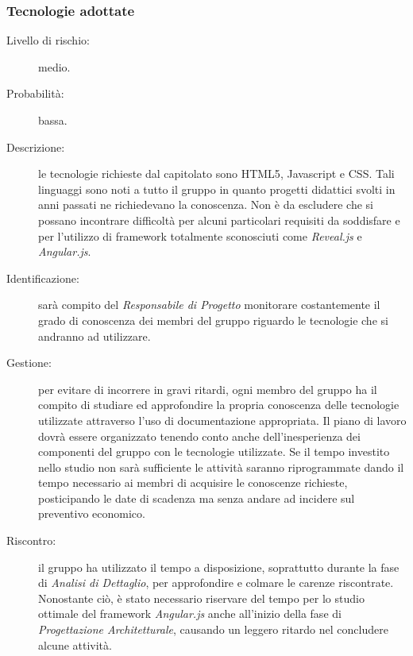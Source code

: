 \subsubsection{Tecnologie adottate}
\begin{description}
	\item[Livello di rischio:] medio.
	\item[Probabilità:] bassa.
	\item[Descrizione:] le tecnologie richieste dal capitolato sono \gls{HTML5}, \gls{Javascript} e \gls{CSS}. Tali linguaggi sono noti a tutto il gruppo in quanto progetti didattici svolti in anni passati ne richiedevano la conoscenza. Non è da escludere che si possano incontrare difficoltà per alcuni particolari requisiti da soddisfare e per l'utilizzo di \gls{framework} totalmente sconosciuti come \textit{\gls{Reveal.js}} e \textit{\gls{Angular.js}}.
	\item[Identificazione:] sarà compito del \textit{Responsabile di Progetto} monitorare costantemente il grado di conoscenza dei membri del gruppo riguardo le tecnologie che si andranno ad utilizzare.
	\item[Gestione:] per evitare di incorrere in gravi ritardi, ogni membro del gruppo ha il compito di studiare ed approfondire la propria conoscenza delle tecnologie utilizzate attraverso l'uso di documentazione appropriata. Il piano di lavoro dovrà essere organizzato tenendo conto anche dell'inesperienza dei componenti del gruppo con le tecnologie utilizzate. Se il tempo investito nello studio non sarà sufficiente le attività saranno riprogrammate dando il tempo necessario ai membri di acquisire le conoscenze richieste, posticipando le date di scadenza ma senza andare ad incidere sul preventivo economico.
	\item[Riscontro:] il gruppo ha utilizzato il tempo a disposizione, soprattutto durante la fase di \textit{Analisi di Dettaglio}, per approfondire e colmare le carenze riscontrate. Nonostante ciò, è stato necessario riservare del tempo per lo studio ottimale del \gls{framework} \textit{\gls{Angular.js}} anche all'inizio della fase di \textit{Progettazione Architetturale}, causando un leggero ritardo nel concludere alcune attività.
\end{description}
